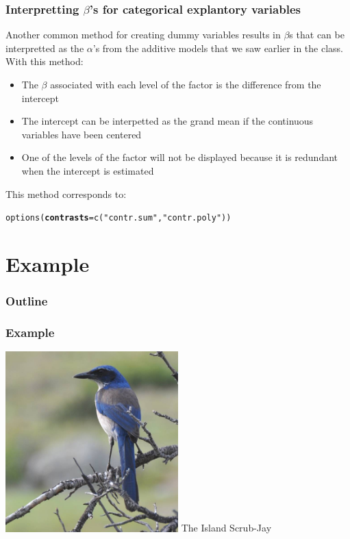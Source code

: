 \documentclass[color=usenames,dvipsnames]{beamer}\usepackage[]{graphicx}\usepackage[]{color}
\makeatletter
\newcommand{\hlstr}[1]{\textcolor[rgb]{0.749,0.012,0.012}{#1}}%
\newcommand{\hlstd}[1]{\textcolor[rgb]{0,0,0}{#1}}%
\newcommand{\hlkwc}[1]{\textcolor[rgb]{0,0,0}{\textbf{#1}}}%
\newcommand{\hlkwd}[1]{\textcolor[rgb]{0.004,0.004,0.506}{#1}}%
\newenvironment{kframe}{%
 \def\at@end@of@kframe{}%
 \ifinner\ifhmode%
  \def\at@end@of@kframe{\end{minipage}}%
  \begin{minipage}{\columnwidth}%
 \fi\fi%
 \def\FrameCommand##1{\hskip\@totalleftmargin \hskip-\fboxsep
 \colorbox{shadecolor}{##1}\hskip-\fboxsep
     \hskip-\linewidth \hskip-\@totalleftmargin \hskip\columnwidth}%
 \MakeFramed {\advance\hsize-\width
   \@totalleftmargin\z@ \linewidth\hsize
   \@setminipage}}%
 {\par\unskip\endMakeFramed%
 \at@end@of@kframe}
\newenvironment{knitrout}{}{} %
\makeatother
\begin{document}
\begin{frame}[fragile]
  \frametitle{\small Interpretting $\beta$'s for categorical explantory
    variables}
  Another common method for creating dummy variables results in
  $\beta$s that can be interpretted as the $\alpha$'s from the
  additive models that we saw earlier in the class.
  \pause
  \vfill
  With this method:
  \begin{itemize}
    \item The $\beta$ associated with each level of the factor is the
      difference from the intercept
    \item The intercept can be interpetted as the grand mean if the
      continuous variables have been centered
    \item One of the levels of the factor will not be displayed
      because it is redundant when the intercept is estimated
  \end{itemize}
  \pause
  \vfill
  This method corresponds to:
\begin{knitrout}\small
{}\color{fgcolor}\begin{kframe}
\begin{alltt}
\hlkwd{options}\hlstd{(}\hlkwc{contrasts}\hlstd{=}\hlkwd{c}\hlstd{(}\hlstr{"contr.sum"}\hlstd{,}\hlstr{"contr.poly"}\hlstd{))}
\end{alltt}
\end{kframe}
\end{knitrout}
\end{frame}



\section{Example}


\begin{frame}
  \frametitle{Outline}
  \LARGE
\end{frame}



\begin{frame}[plain]
  \frametitle{Example}
  \Huge
  \begin{center}
    \includegraphics[width=0.5\textwidth]{figs/issj}
    The Island Scrub-Jay
  \end{center}
\end{frame}
\end{document}
